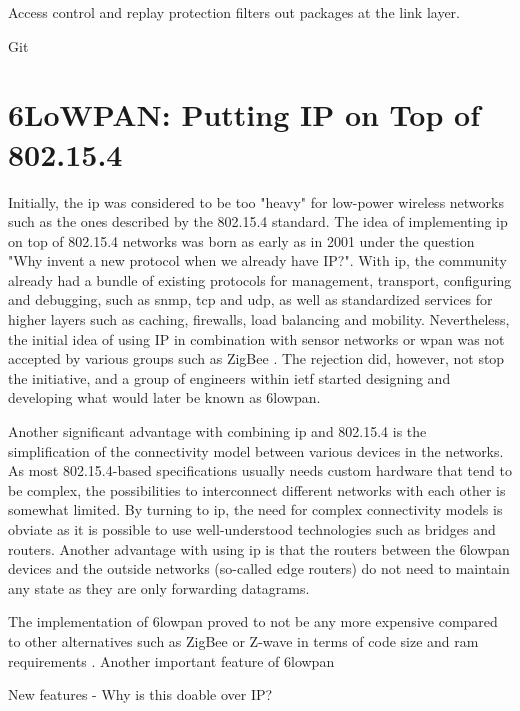  


Access control and replay protection filters out packages at the link layer.

Git


\section{6LoWPAN: Putting IP on Top of 802.15.4}



Initially, the \gls{ip} was considered to be too "heavy" for low-power wireless networks such as the ones described by the 802.15.4 standard. The idea of implementing \gls{ip} on top of 802.15.4 networks was born as early as in 2001 under the question "Why invent a new protocol when we already have IP?"\cite{Mulligan2007}. With \gls{ip}, the community already had a bundle of existing protocols for management, transport, configuring and debugging, such as \gls{snmp}, \gls{tcp} and \gls{udp}, as well as standardized services for higher layers such as caching, firewalls, load balancing and mobility. Nevertheless, the initial idea of using IP in combination with sensor networks or \gls{wpan} was not accepted by various groups such as ZigBee \cite{Mulligan2007}. The rejection did, however, not stop the initiative, and a group of engineers within \gls{ietf} started designing and developing what would later be known as \gls{6lowpan}.

Another significant advantage with combining \gls{ip} and 802.15.4 is the simplification of the connectivity model between various devices in the networks. As most 802.15.4-based specifications usually needs custom hardware that tend to be complex, the possibilities to interconnect different networks with each other is somewhat limited. By turning to \gls{ip}, the need for complex connectivity models is obviate as it is possible to use well-understood technologies such as bridges and routers. Another advantage with using \gls{ip} is that the routers between the \gls{6lowpan} devices and the outside networks (so-called edge routers) do not need to maintain any state as they are only forwarding datagrams.

The implementation of \gls{6lowpan} proved to not be any more expensive compared to other alternatives such as ZigBee or Z-wave in terms of code size and \gls{ram} requirements \cite{Mulligan2007}. Another important feature of \gls{6lowpan}

New features - Why is this doable over IP?

